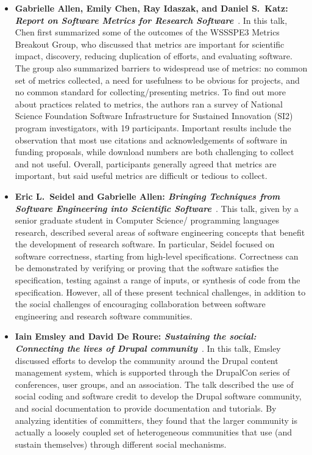 \documentclass[11pt, oneside]{amsart}
\begin{document}
\begin{itemize}[itemsep=1ex]
    \item \textbf{Gabrielle Allen, Emily Chen\textsuperscript{\textasteriskcentered},
    Ray Idaszak, and Daniel S.\ Katz: \textit{Report on Software Metrics for
    Research Software}}~\cite{GAllen:2016wsb}.
    In this talk, Chen first summarized some of the outcomes of the WSSSPE3
    Metrics Breakout Group, who discussed that metrics are important for scientific
    impact, discovery, reducing duplication of efforts, and evaluating software.
    The group also summarized barriers to widespread use of metrics: no common
    set of metrics collected, a need for usefulness to be obvious for projects,
    and no common standard for collecting\slash presenting metrics. To find out
    more about practices related to metrics, the authors ran a survey of National
    Science Foundation Software Infrastructure for Sustained Innovation (SI2)
    program investigators, with 19 participants. Important results include the
    observation that most use citations and acknowledgements of software in
    funding proposals, while download numbers are both challenging to collect
    and not useful. Overall, participants generally agreed that metrics are
    important, but said useful metrics are difficult or tedious to collect.

    \item \textbf{Eric L.~Seidel\textsuperscript{\textasteriskcentered}
    and Gabrielle Allen: \textit{Bringing Techniques from Software Engineering
    into Scientific Software}}~\cite{Seidel:2016ws}.
    This talk, given by a senior graduate student in Computer Science\slash
    programming languages research, described several areas of software engineering
    concepts that benefit the development of research software. In particular,
    Seidel focused on software correctness, starting from high-level
    specifications. Correctness can be demonstrated by verifying or proving
    that the software satisfies the specification, testing against a range of
    inputs, or synthesis of code from the specification. However, all of these
    present technical challenges, in addition to the social challenges of
    encouraging collaboration between software engineering and research software
    communities.

    \item \textbf{Iain Emsley\textsuperscript{\textasteriskcentered} and David
    De Roure: \textit{Sustaining the social: Connecting the lives of Drupal
    community}}~\cite{Emsley:2016ws}.
    In this talk, Emsley discussed efforts to develop the community around the
    Drupal content management system, which is supported through the DrupalCon
    series of conferences, user groups, and an association.
    The talk described the use of social coding and software credit to develop
    the Drupal software community, and social documentation to provide
    documentation and tutorials. By analyzing identities of committers, they
    found that the larger community is actually a loosely coupled set of
    heterogeneous communities that use (and sustain themselves) through different
    social mechanisms.


\end{itemize}
\end{document}
